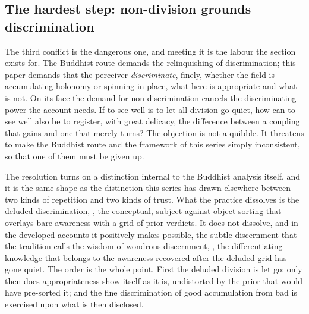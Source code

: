 \subsection{The hardest step: non-division grounds discrimination}
\label{p22:sub:perception-hardest}

The third conflict is the dangerous one, and meeting it is the labour the section exists for. The Buddhist route demands the relinquishing of discrimination; this paper demands that the perceiver \emph{discriminate}, finely, whether the field is accumulating holonomy or spinning in place, what here is appropriate and what is not. On its face the demand for non-discrimination cancels the discriminating power the account needs. If to see well is to let all division go quiet, how can to see well also be to register, with great delicacy, the difference between a coupling that gains and one that merely turns? The objection is not a quibble. It threatens to make the Buddhist route and the framework of this series simply inconsistent, so that one of them must be given up.

The resolution turns on a distinction internal to the Buddhist analysis itself, and it is the same shape as the distinction this series has drawn elsewhere between two kinds of repetition and two kinds of trust. What the practice dissolves is the deluded discrimination, , the conceptual, subject-against-object sorting that overlays bare awareness with a grid of prior verdicts. It does not dissolve, and in the developed accounts it positively makes possible, the subtle discernment that the tradition calls the wisdom of wondrous discernment, , the differentiating knowledge that belongs to the awareness recovered after the deluded grid has gone quiet. The order is the whole point. First the deluded division is let go; only then does appropriateness show itself as it is, undistorted by the prior that would have pre-sorted it; and the fine discrimination of good accumulation from bad is exercised upon what is then disclosed.


